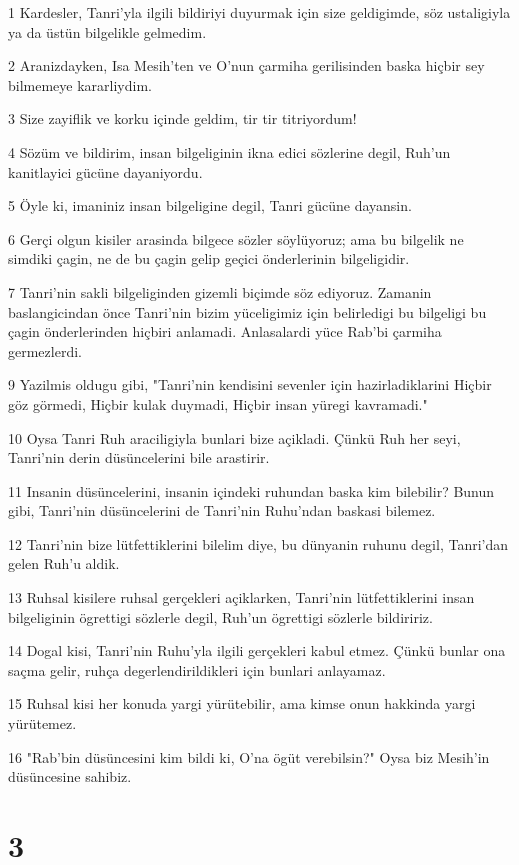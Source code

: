 \par 1 Kardesler, Tanri'yla ilgili bildiriyi duyurmak için size geldigimde, söz ustaligiyla ya da üstün bilgelikle gelmedim.
\par 2 Aranizdayken, Isa Mesih'ten ve O'nun çarmiha gerilisinden baska hiçbir sey bilmemeye kararliydim.
\par 3 Size zayiflik ve korku içinde geldim, tir tir titriyordum!
\par 4 Sözüm ve bildirim, insan bilgeliginin ikna edici sözlerine degil, Ruh'un kanitlayici gücüne dayaniyordu.
\par 5 Öyle ki, imaniniz insan bilgeligine degil, Tanri gücüne dayansin.
\par 6 Gerçi olgun kisiler arasinda bilgece sözler söylüyoruz; ama bu bilgelik ne simdiki çagin, ne de bu çagin gelip geçici önderlerinin bilgeligidir.
\par 7 Tanri'nin sakli bilgeliginden gizemli biçimde söz ediyoruz. Zamanin baslangicindan önce Tanri'nin bizim yüceligimiz için belirledigi bu bilgeligi bu çagin önderlerinden hiçbiri anlamadi. Anlasalardi yüce Rab'bi çarmiha germezlerdi.
\par 9 Yazilmis oldugu gibi, "Tanri'nin kendisini sevenler için hazirladiklarini Hiçbir göz görmedi, Hiçbir kulak duymadi, Hiçbir insan yüregi kavramadi."
\par 10 Oysa Tanri Ruh araciligiyla bunlari bize açikladi. Çünkü Ruh her seyi, Tanri'nin derin düsüncelerini bile arastirir.
\par 11 Insanin düsüncelerini, insanin içindeki ruhundan baska kim bilebilir? Bunun gibi, Tanri'nin düsüncelerini de Tanri'nin Ruhu'ndan baskasi bilemez.
\par 12 Tanri'nin bize lütfettiklerini bilelim diye, bu dünyanin ruhunu degil, Tanri'dan gelen Ruh'u aldik.
\par 13 Ruhsal kisilere ruhsal gerçekleri açiklarken, Tanri'nin lütfettiklerini insan bilgeliginin ögrettigi sözlerle degil, Ruh'un ögrettigi sözlerle bildiririz.
\par 14 Dogal kisi, Tanri'nin Ruhu'yla ilgili gerçekleri kabul etmez. Çünkü bunlar ona saçma gelir, ruhça degerlendirildikleri için bunlari anlayamaz.
\par 15 Ruhsal kisi her konuda yargi yürütebilir, ama kimse onun hakkinda yargi yürütemez.
\par 16 "Rab'bin düsüncesini kim bildi ki, O'na ögüt verebilsin?" Oysa biz Mesih'in düsüncesine sahibiz.

\chapter{3}

